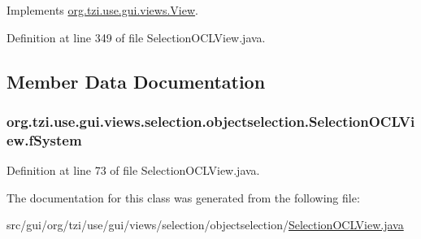 Implements \hyperlink{interfaceorg_1_1tzi_1_1use_1_1gui_1_1views_1_1_view_a00aa5651d40e001288300a6b8bd36868}{org.\-tzi.\-use.\-gui.\-views.\-View}.



Definition at line 349 of file Selection\-O\-C\-L\-View.\-java.



\subsection{Member Data Documentation}
\hypertarget{classorg_1_1tzi_1_1use_1_1gui_1_1views_1_1selection_1_1objectselection_1_1_selection_o_c_l_view_a88f80a85d27facf8d0bf8eca280d0a98}{
\subsubsection[{f\-System}]{ org.\-tzi.\-use.\-gui.\-views.\-selection.\-objectselection.\-Selection\-O\-C\-L\-View.\-f\-System}}\label{classorg_1_1tzi_1_1use_1_1gui_1_1views_1_1selection_1_1objectselection_1_1_selection_o_c_l_view_a88f80a85d27facf8d0bf8eca280d0a98}


Definition at line 73 of file Selection\-O\-C\-L\-View.\-java.



The documentation for this class was generated from the following file\-:\begin{DoxyCompactItemize}
\item 
src/gui/org/tzi/use/gui/views/selection/objectselection/\hyperlink{_selection_o_c_l_view_8java}{Selection\-O\-C\-L\-View.\-java}\end{DoxyCompactItemize}
